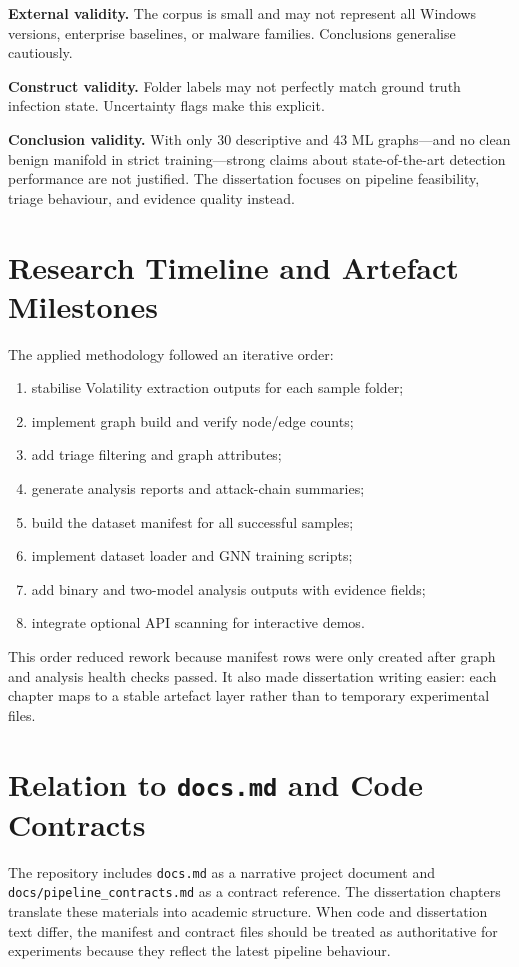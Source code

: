 \textbf{External validity.} The corpus is small and may not represent all Windows versions, enterprise baselines, or malware families. Conclusions generalise cautiously.

\textbf{Construct validity.} Folder labels may not perfectly match ground truth infection state. Uncertainty flags make this explicit.

\textbf{Conclusion validity.} With only 30 descriptive and 43 ML graphs---and no clean benign manifold in strict training---strong claims about state-of-the-art detection performance are not justified. The dissertation focuses on pipeline feasibility, triage behaviour, and evidence quality instead.

\section{Research Timeline and Artefact Milestones}

The applied methodology followed an iterative order:

\begin{enumerate}
\item stabilise Volatility extraction outputs for each sample folder;
\item implement graph build and verify node/edge counts;
\item add triage filtering and graph attributes;
\item generate analysis reports and attack-chain summaries;
\item build the dataset manifest for all successful samples;
\item implement dataset loader and GNN training scripts;
\item add binary and two-model analysis outputs with evidence fields;
\item integrate optional API scanning for interactive demos.
\end{enumerate}

This order reduced rework because manifest rows were only created after graph and analysis health checks passed. It also made dissertation writing easier: each chapter maps to a stable artefact layer rather than to temporary experimental files.

\section{Relation to \texttt{docs.md} and Code Contracts}

The repository includes \texttt{docs.md} as a narrative project document and \texttt{docs/pipeline\_contracts.md} as a contract reference. The dissertation chapters translate these materials into academic structure. When code and dissertation text differ, the manifest and contract files should be treated as authoritative for experiments because they reflect the latest pipeline behaviour.
